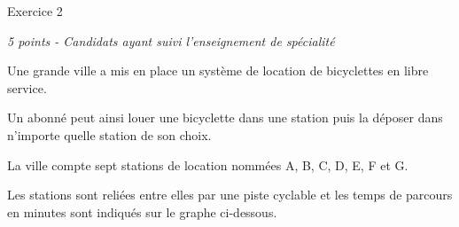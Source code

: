 
%
\begin{h2}Exercice 2\end{h2}
\par
\textit{5 points - Candidats ayant suivi l'enseignement de spécialité}
\par
Une grande ville a mis en place un système de location de bicyclettes en libre service.
\par
Un abonné peut ainsi louer une bicyclette dans une station puis la déposer dans n'importe quelle station de son choix.
\par
La ville compte sept stations de location nommées A, B, C, D, E, F et G.
\par
Les stations sont reliées entre elles par une piste cyclable et les temps de parcours en minutes sont indiqués sur le graphe ci-dessous.

